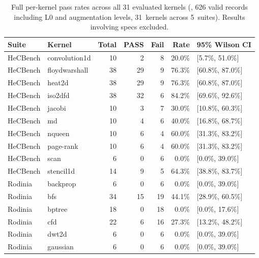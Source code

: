 
\begin{table}[t]
\centering
\caption{Full per-kernel pass rates across all 31 evaluated kernels (\qwenshort{}, 626 valid records including L0 and augmentation levels, 31~kernels across 5~suites). Results involving \knownfail{} specs excluded.}
\label{tab:per-kernel-full}
\footnotesize
\begin{tabular}{@{}llrrrrl@{}}
\toprule
Suite & Kernel & Total & PASS & Fail & Rate & 95\% Wilson CI \\
\midrule
HeCBench & convolution1d & 10 & 2 & 8 & 20.0\% & [5.7\%, 51.0\%] \\
HeCBench & floydwarshall & 38 & 29 & 9 & 76.3\% & [60.8\%, 87.0\%] \\
HeCBench & heat2d & 38 & 29 & 9 & 76.3\% & [60.8\%, 87.0\%] \\
HeCBench & iso2dfd & 38 & 32 & 6 & 84.2\% & [69.6\%, 92.6\%] \\
HeCBench & jacobi & 10 & 3 & 7 & 30.0\% & [10.8\%, 60.3\%] \\
HeCBench & md & 10 & 4 & 6 & 40.0\% & [16.8\%, 68.7\%] \\
HeCBench & nqueen & 10 & 6 & 4 & 60.0\% & [31.3\%, 83.2\%] \\
HeCBench & page-rank & 10 & 6 & 4 & 60.0\% & [31.3\%, 83.2\%] \\
HeCBench & scan & 6 & 0 & 6 & 0.0\% & [0.0\%, 39.0\%] \\
HeCBench & stencil1d & 14 & 9 & 5 & 64.3\% & [38.8\%, 83.7\%] \\
\midrule
Rodinia & backprop & 6 & 0 & 6 & 0.0\% & [0.0\%, 39.0\%] \\
Rodinia & bfs & 34 & 15 & 19 & 44.1\% & [28.9\%, 60.5\%] \\
Rodinia & bptree & 18 & 0 & 18 & 0.0\% & [0.0\%, 17.6\%] \\
Rodinia & cfd & 22 & 6 & 16 & 27.3\% & [13.2\%, 48.2\%] \\
Rodinia & dwt2d & 6 & 0 & 6 & 0.0\% & [0.0\%, 39.0\%] \\
Rodinia & gaussian & 6 & 0 & 6 & 0.0\% & [0.0\%, 39.0\%] \\

\end{tabular}
\end{table}
